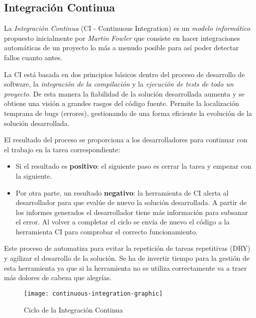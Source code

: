 
\subsection{Integración Continua}
\label{sub:integracion-continua}

\par La \emph{Integración Continua} (CI - Continuous Integration) es un \emph{modelo informático} propuesto inicialmente por \emph{Martin Fowler} que consiste en hacer integraciones automáticas de un proyecto lo más a menudo posible para así poder detectar fallos cuanto antes.

\par La CI está basada en dos principios básicos dentro del proceso de desarrollo de software, la \emph{integración de la compilación} y la \emph{ejecución de tests de todo un proyecto}. De esta manera la fiabilidad de la solución desarrollada aumenta y se obtiene una visión a grandes rasgos del código fuente. Permite la localización temprana de bugs (errores), gestionando de una forma eficiente la evolución de la solución desarrollada.

\par El resultado del proceso se proporciona a los desarrolladores para continuar con el trabajo en la tarea correspondiente:

\begin{itemize}
	\item Si el resultado es \textbf{positivo}: el siguiente paso es cerrar la tarea y empezar con la siguiente.
	\item Por otra parte, un resultado \textbf{negativo}: la herramienta de CI alerta al desarrollador para que evalúe de nuevo la solución desarrollada. A partir de los informes generados el desarrollador tiene más información para subsanar el error. Al volver a completar el ciclo se envía de nuevo el código a la herramienta CI para comprobar el correcto funcionamiento.
\end{itemize}

\par Este proceso de automatiza para evitar la repetición de tareas repetitivas (DRY) y agilizar el desarrollo de la solución. Se ha de invertir tiempo para la gestión de esta herramienta ya que si la herramienta no se utiliza correctamente va a traer más dolores de cabeza que alegrías.

\begin{figure}[H]
    \centering
    \texttt{[image: continuous-integration-graphic]}
    \caption{Ciclo de la Integración Continua}
    \label{fig:continuous-integration-graphic}
\end{figure}


